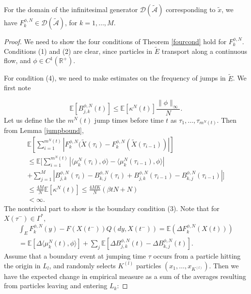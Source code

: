\begin{theorem}\label{gencalcs}
For the domain of the infinitesimal generator $\mathcal D(\tilde {\mathcal A})$ corresponding to $\tilde x$, we have $F^{\phi,N}_k \in \mathcal D(\tilde {\mathcal A})$, for $k = 1,\dots, M$. 
\end{theorem}

\begin{proof} We need to show the four conditions of Theorem \ref{fourcond} hold for $F^{\phi,N}_k$.  Conditions (1) and (2) are clear, since particles in $\tilde E$ transport along a continuous flow, and $\phi \in C^1(\mathbb{R}^+)$.

For condition (4), we need to make estimates on the frequency of jumps in $\tilde E$.  We first note 

\begin{equation}
\mathbb E\left[B_{j,k}^{\phi,N}(t)\right] \le \mathbb E[\kappa^N(t)]\frac{\|\phi\|_\infty}{N}.  
\end{equation}
Let us define the the $m^N(t)$ jump times before time $t$ as $\tau_1, \dots, \tau_{m^N(t)}$. Then from Lemma \ref{jumpbound},
\begin{eqnarray}
\mathbb{E}\left[\sum_{i = 1}^{m^N(t)} |F_k^{\phi,N}(\tilde X(
\tau_i)-F_k^{\phi,N}(\tilde X(\tau_{i-1}))|\right]  \\
\le \mathbb{E}\Big [\sum_{i = 1}^{m^N(t)}|\langle \mu^N_k(\tau_i),\phi\rangle-\langle \mu^N_k(\tau_{i-1}),\phi\rangle|\nonumber\\+\sum_{j = 1}^M|B_{j,k}^{\phi,N}(\tau_i)-B_{k,j}^{\phi,N}(\tau_i)+ B_{j,k}^{\phi,N}(\tau_{i-1})-B_{k,j}^{\phi,N}(\tau_{i-1})|  \Big]\nonumber  \\
\le \frac{4M}N\mathbb{E}[\kappa^N(t)]\le\frac{4MK}N(\beta tN+N) \nonumber \\
< \infty.  \nonumber
\end{eqnarray}
The nontrivial part to show is the boundary condition (3).
 Note that for $X(\tau^-) \in \Gamma^*$, 
  \begin{eqnarray}
 \int_E F_k^{\phi,N}(y)-F(X(t^-)) Q(dy,X(t^-)) = \mathbb E(\Delta F_k^{\phi,N}(X(t)))\\
 =\mathbb E\left[\Delta \langle \mu_k^N(t), \phi \rangle \right]+\sum_j\mathbb E\left[\Delta B_{j,k}^{\phi,N}(t) -\Delta B_{k,j}^{\phi,N}(t) \right].\nonumber 
\end{eqnarray}
Assume that a  boundary event at jumping time $\tau$ occurs from a particle hitting the origin in $L_l$, and randomly selects $K^{(l)}$ particles $(x_1, \dots, x_{K^{(l)}})$.  Then we have the expected change in empirical measure as a sum of the averages resulting from particles leaving and entering $L_k$: 

\end{proof}
